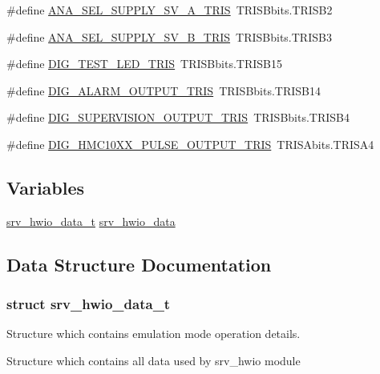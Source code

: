 \begin{DoxyCompactItemize}
\#define \hyperlink{a00034_a202b949551441c2047a818fb1fcb4520}{A\+N\+A\+\_\+\+S\+E\+L\+\_\+\+S\+U\+P\+P\+L\+Y\+\_\+\+S\+V\+\_\+\+A\+\_\+\+T\+R\+I\+S}~T\+R\+I\+S\+Bbits.\+T\+R\+I\+S\+B2
\item 
\#define \hyperlink{a00034_afe07f742315c811d8986bb790d3027f4}{A\+N\+A\+\_\+\+S\+E\+L\+\_\+\+S\+U\+P\+P\+L\+Y\+\_\+\+S\+V\+\_\+\+B\+\_\+\+T\+R\+I\+S}~T\+R\+I\+S\+Bbits.\+T\+R\+I\+S\+B3
\item 
\#define \hyperlink{a00034_af8b26b4b9327a36f53d2d9acdec6d6c1}{D\+I\+G\+\_\+\+T\+E\+S\+T\+\_\+\+L\+E\+D\+\_\+\+T\+R\+I\+S}~T\+R\+I\+S\+Bbits.\+T\+R\+I\+S\+B15
\item 
\#define \hyperlink{a00034_a65c85b1d486b314430cd3a5b77ab84c3}{D\+I\+G\+\_\+\+A\+L\+A\+R\+M\+\_\+\+O\+U\+T\+P\+U\+T\+\_\+\+T\+R\+I\+S}~T\+R\+I\+S\+Bbits.\+T\+R\+I\+S\+B14
\item 
\#define \hyperlink{a00034_a5459e774c229eaef3db4a6dc3b3d13c2}{D\+I\+G\+\_\+\+S\+U\+P\+E\+R\+V\+I\+S\+I\+O\+N\+\_\+\+O\+U\+T\+P\+U\+T\+\_\+\+T\+R\+I\+S}~T\+R\+I\+S\+Bbits.\+T\+R\+I\+S\+B4
\item 
\#define \hyperlink{a00034_ab1c495ea3dba84156038b314588146b5}{D\+I\+G\+\_\+\+H\+M\+C10\+X\+X\+\_\+\+P\+U\+L\+S\+E\+\_\+\+O\+U\+T\+P\+U\+T\+\_\+\+T\+R\+I\+S}~T\+R\+I\+S\+Abits.\+T\+R\+I\+S\+A4
\end{DoxyCompactItemize}
\subsection*{Variables}
\begin{DoxyCompactItemize}
\item 
\hyperlink{a00034_dc/d0c/a00783}{srv\+\_\+hwio\+\_\+data\+\_\+t} \hyperlink{a00034_a0fd91014631926f362c7c2b2f5d143b0}{srv\+\_\+hwio\+\_\+data}
\end{DoxyCompactItemize}


\subsection{Data Structure Documentation}
\label{dc/d0c/a00783}
\hypertarget{a00034_dc/d0c/a00783}{}
\subsubsection{struct srv\+\_\+hwio\+\_\+data\+\_\+t}
Structure which contains emulation mode operation details. 

Structure which contains all data used by srv\+\_\+hwio module 

